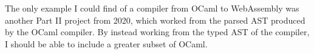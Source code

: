 \documentclass[12pt]{article}
\begin{document}


The only example I could find of a compiler from OCaml to WebAssembly was another Part II project from 2020, which worked from the parsed AST produced by the OCaml compiler. By instead working from the typed AST of the compiler, I should be able to include a greater subset of OCaml.

\end{document}
